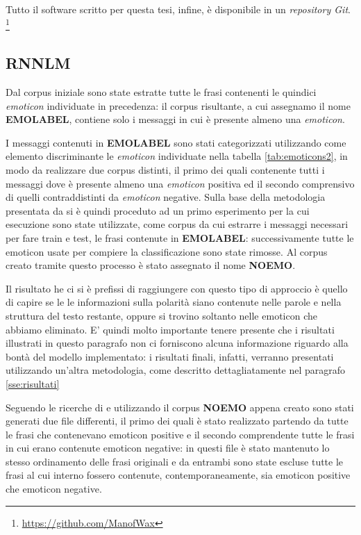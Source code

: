 \documentclass[a4paper,12pt,openright,twoside]{report}
\theoremstyle{definition}
\begin{document}
Tutto il software scritto per questa tesi, infine, è disponibile in un \emph{repository Git}.
\footnote{\url{https://github.com/ManofWax}}

\subsection{RNNLM}
\label{sss:rnnlm}
Dal corpus iniziale sono state estratte tutte le frasi contenenti le quindici \emph{emoticon} individuate in precedenza:
il corpus risultante, a cui assegnamo il nome \textbf{EMOLABEL}, contiene solo i messaggi in cui è presente almeno una \emph{emoticon}.

I messaggi contenuti in \textbf{EMOLABEL} sono stati categorizzati utilizzando come elemento discriminante le \emph{emoticon} individuate nella tabella
 \ref{tab:emoticons2}, in modo da realizzare due corpus distinti, il primo dei quali contenente tutti i messaggi dove è presente almeno una \emph{emoticon} positiva ed il secondo
comprensivo di quelli contraddistinti da \emph{emoticon} negative.
Sulla base della metodologia presentata da \citep{Ko2010, Pak2013, Turn2012, Jhon2013, Kirk2010}
si è quindi proceduto ad un primo esperimento per la cui esecuzione sono state utilizzate, come corpus da cui  estrarre i messaggi necessari per fare train e test, le frasi contenute in \textbf{EMOLABEL}: successivamente tutte le emoticon usate per compiere la classificazione sono state rimosse. Al corpus creato tramite questo processo è stato assegnato il nome \textbf{NOEMO}.

Il risultato he ci si è prefissi di raggiungere con questo tipo di approccio è quello di capire se le le informazioni sulla polarità siano contenute nelle parole e nella struttura del testo restante, oppure si trovino soltanto nelle emoticon che abbiamo eliminato. E’ quindi molto importante tenere presente che i risultati illustrati in questo paragrafo non ci forniscono alcuna informazione riguardo alla bontà del modello implementato:
i risultati finali, infatti, verranno presentati utilizzando un'altra metodologia, come descritto dettagliatamente nel paragrafo \ref{sse:risultati}

Seguendo le ricerche di \cite{MikRNN} e utilizzando il corpus \textbf{NOEMO} appena creato sono stati generati due file differenti,
il primo dei quali è stato realizzato partendo da tutte le frasi che contenevano emoticon positive e il secondo comprendente
tutte le frasi in cui erano contenute emoticon negative: in questi file è stato mantenuto lo stesso ordinamento delle frasi originali
e da entrambi sono state escluse tutte le frasi al cui interno fossero contenute, 
contemporaneamente, sia emoticon positive che emoticon negative. 
\end{document}
